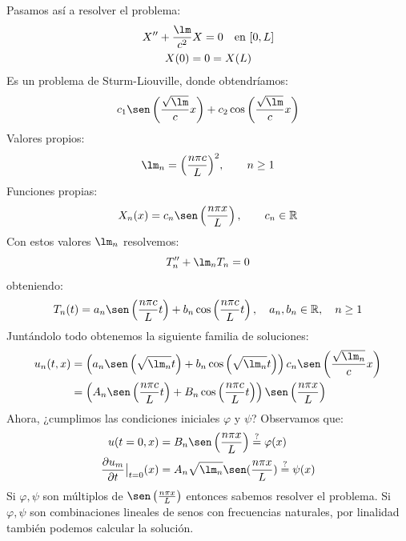 Pasamos así a resolver el problema:
\begin{gather*}
    X'' + \frac{\lm}{c^2} X = 0 \quad \text{en\ } [0,L] \\
    X(0) = 0 = X(L)
\end{gather*}
Es un problema de Sturm-Liouville, donde obtendríamos: %
\begin{equation*}
    c_1\sen\left(\frac{\sqrt{\lm}}{c}x\right) + c_2\cos\left(\frac{\sqrt{\lm}}{c}x\right)
\end{equation*}
Valores propios:
\begin{equation*}
    \lm_n = {\left(\frac{n\pi c}{L}\right)}^{2}, \qquad n\geq 1
\end{equation*}
Funciones propias:
\begin{equation*}
    X_n(x) = c_n \sen\left(\frac{n\pi x}{L}\right), \qquad c_n \in \mathbb{R}
\end{equation*}
Con estos valores $\lm_n$ resolvemos:
\begin{equation*}
    T_n'' + \lm_n T_n = 0
\end{equation*}
obteniendo:
\begin{equation*}
    T_n(t) = a_n \sen\left(\frac{n\pi c}{L}t\right) + b_n \cos\left(\frac{n\pi c}{L}t\right), \quad a_n,b_n\in \mathbb{R}, \quad n\geq 1
\end{equation*}
Juntándolo todo obtenemos la siguiente familia de soluciones:
\begin{align*}
    u_n(t,x) &= \left(a_n\sen\left(\sqrt{\lm_n}t\right) + b_n\cos\left(\sqrt{\lm_n}t\right)\right)c_n\sen\left(\frac{\sqrt{\lm_n}}{c}x\right) \\
             &= \left(A_n\sen\left(\frac{n\pi c}{L}t\right) + B_n\cos\left(\frac{n\pi c}{L}t\right)\right)\sen\left(\frac{n\pi x}{L}\right)
\end{align*}
Ahora, ¿cumplimos las condiciones iniciales $\varphi$ y $\psi$? Observamos que:
\begin{align*}
    u(t=0,x) &= B_n\sen\left(\frac{n\pi x}{L}\right) \stackrel{?}{=} \varphi(x) \\
    \frac{\partial u_m}{\partial t}\big|_{t=0}(x) &= A_n\sqrt{\lm_n}\sen(\frac{n\pi x}{L}) \stackrel{?}{=} \psi(x)
\end{align*}
Si $\varphi,\psi$ son múltiplos de $\sen\left(\frac{n\pi x}{L}\right)$ entonces sabemos resolver el problema. Si $\varphi,\psi$ son combinaciones lineales de senos con frecuencias naturales, por linalidad también podemos calcular la solución.\\

